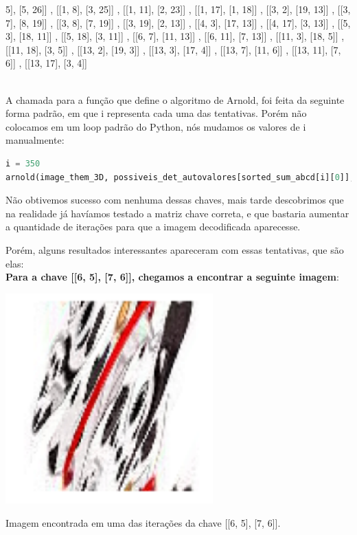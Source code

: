 \documentclass[a4paper, 12pt]{article}
\begin{document}
\begin{footnotesize}
5], [5, 26]] , [[1, 8], [3, 25]] , [[1, 11], [2, 23]] , [[1, 17], [1, 18]] , [[3, 2], [19, 13]] , [[3, 7], [8, 19]] , [[3, 8], [7, 19]] , [[3, 19], [2, 13]] , [[4, 3], [17, 13]] , [[4, 17], [3, 13]] , [[5, 3], [18, 11]] , [[5, 18], [3, 11]] , [[6, 7], [11, 13]] , [[6, 11], [7, 13]] , [[11, 3], [18, 5]] , [[11, 18], [3, 5]] , [[13, 2], [19, 3]] , [[13, 3], [17, 4]] , [[13, 7], [11, 6]] , [[13, 11], [7, 6]] , [[13, 17], [3, 4]]
\end{footnotesize}\\

A chamada para a função que define o algoritmo de Arnold, foi feita da seguinte forma padrão, em que i representa cada uma das tentativas. Porém não colocamos em um loop padrão do Python, nós mudamos os valores de i manualmente:

\begin{lstlisting}[language=Python, caption = chamada do algoritmo de Arnold.]
i = 350
arnold(image_them_3D, possiveis_det_autovalores[sorted_sum_abcd[i][0]], it=30)
\end{lstlisting}

Não obtivemos sucesso com nenhuma dessas chaves, mais tarde descobrimos que na realidade já havíamos testado a matriz chave correta, e que bastaria aumentar a quantidade de iterações para que a imagem decodificada aparecesse.

Porém, alguns resultados interessantes apareceram com essas tentativas, que são elas: \\

\textbf{Para a chave [[6, 5], [7, 6]], chegamos a encontrar a seguinte imagem}:

\begin{center}
    \includegraphics[width=8cm]{132.PNG}
    
    Imagem encontrada em uma das iterações da chave [[6, 5], [7, 6]].
\end{center}
$$$$\\\\\\\\\\\\\\
\end{document}
